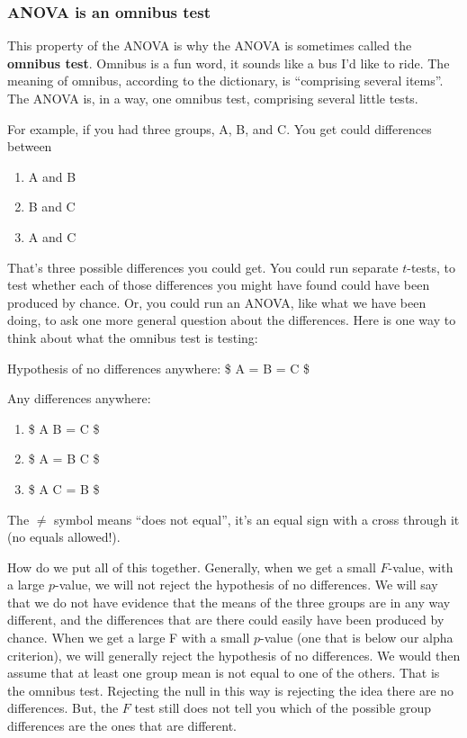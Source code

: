 \documentclass[
  letterpaper,
  DIV=11,
  numbers=noendperiod]{scrreprt}
\providecommand{\tightlist}{%
  \setlength{\itemsep}{0pt}\setlength{\parskip}{0pt}}\usepackage{longtable,booktabs,array}
\begin{document}
\subsubsection{ANOVA is an omnibus test}\label{anova-is-an-omnibus-test}

This property of the ANOVA is why the ANOVA is sometimes called the
\textbf{omnibus test}. Omnibus is a fun word, it sounds like a bus I'd
like to ride. The meaning of omnibus, according to the dictionary, is
``comprising several items''. The ANOVA is, in a way, one omnibus test,
comprising several little tests.

For example, if you had three groups, A, B, and C. You get could
differences between

\begin{enumerate}
\def\labelenumi{\arabic{enumi}.}
\tightlist
\item
  A and B
\item
  B and C
\item
  A and C
\end{enumerate}

That's three possible differences you could get. You could run separate
\(t\)-tests, to test whether each of those differences you might have
found could have been produced by chance. Or, you could run an ANOVA,
like what we have been doing, to ask one more general question about the
differences. Here is one way to think about what the omnibus test is
testing:

Hypothesis of no differences anywhere: \$ A = B = C \$

Any differences anywhere:

\begin{enumerate}
\def\labelenumi{\alph{enumi}.}
\tightlist
\item
  \$ A \neq B = C \$
\item
  \$ A = B \neq C \$
\item
  \$ A \neq C = B \$
\end{enumerate}

The \(\neq\) symbol means ``does not equal'', it's an equal sign with a
cross through it (no equals allowed!).

How do we put all of this together. Generally, when we get a small
\(F\)-value, with a large \(p\)-value, we will not reject the hypothesis
of no differences. We will say that we do not have evidence that the
means of the three groups are in any way different, and the differences
that are there could easily have been produced by chance. When we get a
large F with a small \(p\)-value (one that is below our alpha
criterion), we will generally reject the hypothesis of no differences.
We would then assume that at least one group mean is not equal to one of
the others. That is the omnibus test. Rejecting the null in this way is
rejecting the idea there are no differences. But, the \(F\) test still
does not tell you which of the possible group differences are the ones
that are different.
\end{document}
